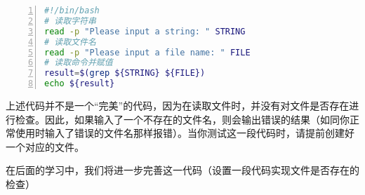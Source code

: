 \begin{lstlisting}[language=bash,caption=print\_string,numbers=left]
#!/bin/bash
# 读取字符串
read -p "Please input a string: " STRING
# 读取文件名
read -p "Please input a file name: " FILE
# 读取命令并赋值
result=$(grep ${STRING} ${FILE})
echo ${result}
\end{lstlisting}

\begin{attention}
    上述代码并不是一个“完美”的代码，因为在读取文件时，并没有对文件是否存在进行检查。因此，如果输入了一个不存在的文件名，则会输出错误的结果（如同你正常使用时输入了错误的文件名那样报错）。当你测试这一段代码时，请提前创建好一个对应的文件。

    在后面的学习中，我们将进一步完善这一代码（设置一段代码实现文件是否存在的检查）
\end{attention}